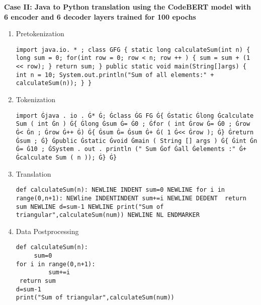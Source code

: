 \textbf{Case II: Java to Python translation using the CodeBERT model with 6 encoder and 6 decoder layers trained for 100 epochs }
\begin{enumerate}[topsep = 0pt, label = \roman*.]
\item Pretokenization \\
\vspace*{-\baselineskip}
\begin{Verbatim}[frame=single, breaklines=true, breakanywhere=true]
import java.io. * ; class GFG { static long calculateSum(int n) { long sum = 0; for(int row = 0; row < n; row ++ ) { sum = sum + (1 << row); } return sum; } public static void main(String[]args) { int n = 10; System.out.println("Sum of all elements:" + calculateSum(n)); } }
\end{Verbatim}

\item Tokenization \\
\vspace*{-\baselineskip}
\begin{Verbatim}[frame=single, breaklines=true, breakanywhere=true]
import Ġjava . io . Ġ* Ġ; Ġclass ĠG FG Ġ{ Ġstatic Ġlong Ġcalculate Sum ( int Ġn ) Ġ{ Ġlong Ġsum Ġ= Ġ0 ; Ġfor ( int Ġrow Ġ= Ġ0 ; Ġrow Ġ< Ġn ; Ġrow Ġ++ Ġ) Ġ{ Ġsum Ġ= Ġsum Ġ+ Ġ( 1 Ġ<< Ġrow ); Ġ} Ġreturn Ġsum ; Ġ} Ġpublic Ġstatic Ġvoid Ġmain ( String [] args ) Ġ{ Ġint Ġn Ġ= Ġ10 ; ĠSystem . out . println (" Sum Ġof Ġall Ġelements :" Ġ+ Ġcalculate Sum ( n )); Ġ} Ġ}
\end{Verbatim}

\item Translation \\
\vspace*{-\baselineskip}
\begin{Verbatim}[frame=single, breaklines=true, breakanywhere=true]
def calculateSum(n): NEWLINE INDENT sum=0 NEWLINE for i in range(0,n+1): NEWline INDENTINDENT sum+=i NEWLINE DEDENT  return sum NEWLINE d=sum-1 NEWLINE print("Sum of triangular",calculateSum(num)) NEWLINE NL ENDMARKER
\end{Verbatim}

\item Data Postprocessing \\
\vspace*{-\baselineskip}
\begin{Verbatim}[frame=single, breaklines=true, breakanywhere=true]
def calculateSum(n):
     sum=0
for i in range(0,n+1):
         sum+=i
 return sum
d=sum-1
print("Sum of triangular",calculateSum(num))
\end{Verbatim}
\end{enumerate}

